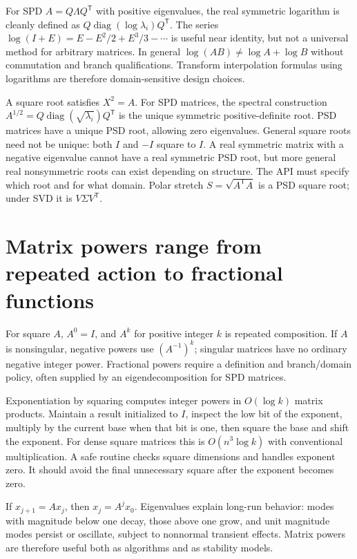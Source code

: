 For SPD \(A=Q\Lambda Q^\mathsf T\) with positive eigenvalues, the real symmetric logarithm is cleanly defined as \(Q\operatorname{diag}(\log\lambda_i)Q^\mathsf T\). The series \(\log(I+E)=E-E^2/2+E^3/3-\cdots\) is useful near identity, but not a universal method for arbitrary matrices. In general \(\log(AB)\ne\log A+\log B\) without commutation and branch qualifications. Transform interpolation formulas using logarithms are therefore domain-sensitive design choices.

A square root satisfies \(X^2=A\). For SPD matrices, the spectral construction \(A^{1/2}=Q\operatorname{diag}(\sqrt{\lambda_i})Q^\mathsf T\) is the unique symmetric positive-definite root. PSD matrices have a unique PSD root, allowing zero eigenvalues. General square roots need not be unique: both \(I\) and \(-I\) square to \(I\). A real symmetric matrix with a negative eigenvalue cannot have a real symmetric PSD root, but more general real nonsymmetric roots can exist depending on structure. The API must specify which root and for what domain. Polar stretch \(S=\sqrt{A^\mathsf TA}\) is a PSD square root; under SVD it is \(V\Sigma V^\mathsf T\).

\section{Matrix powers range from repeated action to fractional functions}\label{02-foundations-ii-ch026-matrix-powers-range-from-repeated-action-to-fractional-functions}

For square \(A\), \(A^0=I\), and \(A^k\) for positive integer \(k\) is repeated composition. If \(A\) is nonsingular, negative powers use \((A^{-1})^k\); singular matrices have no ordinary negative integer power. Fractional powers require a definition and branch/domain policy, often supplied by an eigendecomposition for SPD matrices.

Exponentiation by squaring computes integer powers in \(O(\log k)\) matrix products. Maintain a result initialized to \(I\), inspect the low bit of the exponent, multiply by the current base when that bit is one, then square the base and shift the exponent. For dense square matrices this is \(O(n^3\log k)\) with conventional multiplication. A safe routine checks square dimensions and handles exponent zero. It should avoid the final unnecessary square after the exponent becomes zero.

If \(x_{j+1}=Ax_j\), then \(x_j=A^jx_0\). Eigenvalues explain long-run behavior: modes with magnitude below one decay, those above one grow, and unit magnitude modes persist or oscillate, subject to nonnormal transient effects. Matrix powers are therefore useful both as algorithms and as stability models.

